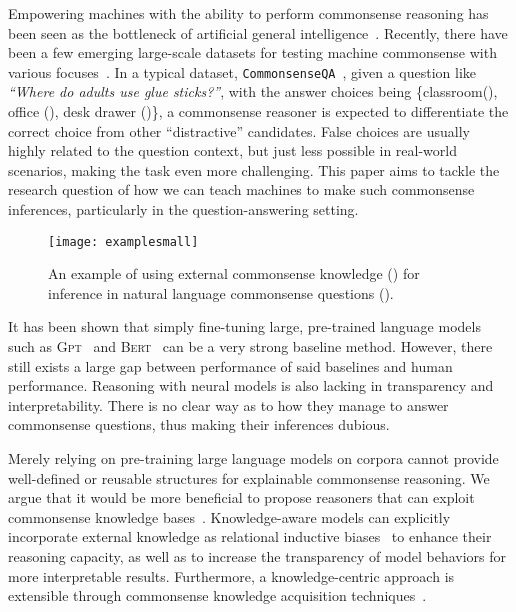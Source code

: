 \documentclass[11pt,a4paper]{article}
\newlength{\HeightReference}
\newcommand{\MyColorBox}[2][red]{\settowidth{\Width}{#2}\colorbox{#1}{\raisebox{-\DepthReference}{\parbox[b][\HeightReference+\DepthReference][c]{\Width}{\centering#2}}}}
\begin{document}
Empowering machines with the ability to perform commonsense reasoning has been seen as the bottleneck of artificial general intelligence~\cite{davis2015commonsense}.
Recently, there have been a few emerging large-scale datasets for testing machine commonsense with various focuses~\cite{Zellers2018SWAGAL, Sap2019SocialIQACR, Zellers2019FromRT}.
In a typical dataset, \texttt{CommonsenseQA}~\cite{Talmor2018CommonsenseQAAQ},
given a question like \textit{``Where do adults use glue sticks?''}, with the answer choices being \{classroom(\xmark), {office} (\cmark), desk drawer (\xmark)\},
a commonsense reasoner is expected to differentiate the correct choice from other ``distractive'' candidates. 
False choices are usually highly related to the question context, but just less possible in real-world scenarios, making the task even more challenging.
This paper aims to tackle the research question of how we can teach machines to make such commonsense inferences, particularly in the question-answering setting.
\begin{figure}
	\centering
	\texttt{[image: examplesmall]}
	\caption{An example of using external commonsense knowledge (\MyColorBox[cyan!10]{symbolic space})
	for inference in natural language commonsense questions (\MyColorBox[yellow!10]{semantic space}). }
	\label{fig:example}
\end{figure}

It has been shown that simply fine-tuning large, pre-trained language models such as \textsc{Gpt}~\cite{radford2018improving} and \textsc{Bert}~\cite{Devlin2019} can be a very strong baseline method.
However, there still exists a large gap between performance of said baselines and human performance.
Reasoning with neural models is also lacking in transparency and interpretability.
There is no clear way as to how they manage to answer commonsense questions, thus making their inferences dubious.

Merely relying on pre-training large language models on corpora cannot provide well-defined or reusable structures for explainable commonsense reasoning. 
We argue that it would be more beneficial to propose reasoners that can exploit commonsense knowledge bases~\cite{Speer2017ConceptNet5A, Tandon2017WebChild2, sap2018atomic}. 
Knowledge-aware models can explicitly incorporate external knowledge as relational inductive biases~\cite{Battaglia2018RelationalIB} to enhance their reasoning capacity, as well as to increase the transparency of model behaviors for more interpretable results. 
Furthermore, a knowledge-centric approach is extensible through commonsense knowledge acquisition techniques~\cite{li2016commonsense, Xu2018AutomaticEO}.
\end{document}

